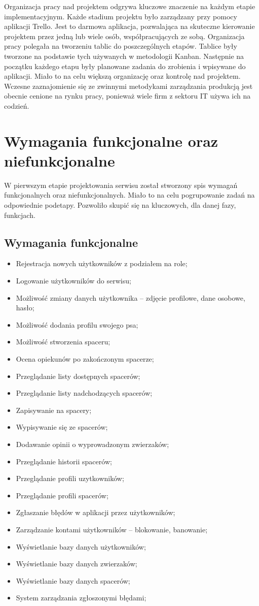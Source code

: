 Organizacja pracy nad projektem odgrywa kluczowe znaczenie na każdym etapie implementacyjnym. Każde stadium projektu było zarządzany przy pomocy aplikacji Trello. Jest to darmowa aplikacja, pozwalająca na skuteczne kierowanie projektem przez jedną lub wiele osób, współpracujących ze sobą. Organizacja pracy polegała na tworzeniu tablic do poszczególnych etapów. Tablice były tworzone na podstawie tych używanych w metodologii Kanban. Następnie na początku każdego etapu były planowane zadania do zrobienia i wpisywane do aplikacji. Miało to na celu większą organizację oraz kontrolę nad projektem. Wczesne zaznajomienie się ze zwinnymi metodykami zarządzania produkcją jest obecnie cenione na rynku pracy, ponieważ wiele firm z sektoru IT używa ich na codzień.
\section{Wymagania funkcjonalne oraz niefunkcjonalne}

W pierwszym etapie projektowania serwisu został stworzony spis wymagań funkcjonalnych oraz niefunkcjonalnych. Miało to na celu pogrupowanie zadań na odpowiednie podetapy. Pozwoliło skupić się na kluczowych, dla danej fazy, funkcjach.
\subsection{Wymagania funkcjonalne}
\begin{itemize}
    \item Rejestracja nowych użytkowników z podziałem na role;
    \item Logowanie użytkowników do serwisu;
    \item Możliwość zmiany danych użytkownika -- zdjęcie profilowe, dane osobowe, hasło;
    \item Możliwość dodania profilu swojego psa;
    \item Możliwość stworzenia spaceru;
    \item Ocena opiekunów po zakończonym spacerze;
    \item Przeglądanie listy dostępnych spacerów;
    \item Przeglądanie listy nadchodzących spacerów;
    \item Zapisywanie na spacery;
    \item Wypisywanie się ze spacerów;
    \item Dodawanie opinii o wyprowadzonym zwierzaków;
    \item Przeglądanie historii spacerów;
    \item Przeglądanie profili uzytkowników;
    \item Przeglądanie profili spacerów;
    \item Zgłaszanie błędów w aplikacji przez użytkowników;
    \item Zarządzanie kontami użytkowników -- blokowanie, banowanie;
    \item Wyświetlanie bazy danych użytkowników;
    \item Wyświetlanie bazy danych zwierzaków;
    \item Wyświetlanie bazy danych spacerów;
    \item System zarządzania zgłoszonymi błędami;
\end{itemize}
